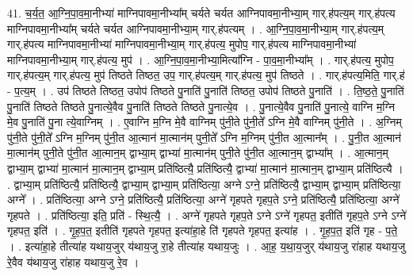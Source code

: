 \documentclass[17pt]{extarticle}
\begin{document}
41. च॒र्य॒त॒ आ॒ग्नि॒पा॒व॒मा॒नीभ्या॑ माग्निपावमा॒नीभ्या᳚म् चर्यते चर्यत आग्निपावमा॒नीभ्या॒म् गार्.ह॑पत्य॒म् गार्.ह॑पत्य माग्निपावमा॒नीभ्या᳚म् चर्यते चर्यत आग्निपावमा॒नीभ्या॒म् गार्.ह॑पत्यम् । . आ॒ग्नि॒पा॒व॒मा॒नीभ्या॒म् गार्.ह॑पत्य॒म् गार्.ह॑पत्य माग्निपावमा॒नीभ्या॑ माग्निपावमा॒नीभ्या॒म् गार्.ह॑पत्य॒ मुपोप॒ गार्.ह॑पत्य माग्निपावमा॒नीभ्या॑ माग्निपावमा॒नीभ्या॒म् गार्.ह॑पत्य॒ मुप॑ । . आ॒ग्नि॒पा॒व॒मा॒नीभ्या॒मित्या᳚ग्नि - पा॒व॒मा॒नीभ्या᳚म् । . गार्.ह॑पत्य॒ मुपोप॒ गार्.ह॑पत्य॒म् गार्.ह॑पत्य॒ मुप॑ तिष्ठते तिष्ठत॒ उप॒ गार्.ह॑पत्य॒म् गार्.ह॑पत्य॒ मुप॑ तिष्ठते । . गार्.ह॑पत्य॒मिति॒ गार्.ह॑ - प॒त्य॒म् । . उप॑ तिष्ठते तिष्ठत॒ उपोप॑ तिष्ठते पु॒नाति॑ पु॒नाति॑ तिष्ठत॒ उपोप॑ तिष्ठते पु॒नाति॑ । . ति॒ष्ठ॒ते॒ पु॒नाति॑ पु॒नाति॑ तिष्ठते तिष्ठते पु॒नात्ये॒वैव पु॒नाति॑ तिष्ठते तिष्ठते पु॒नात्ये॒व । . पु॒नात्ये॒वैव पु॒नाति॑ पु॒नात्ये॒ वाग्नि म॒ग्नि मे॒व पु॒नाति॑ पु॒ना त्ये॒वाग्निम् । . ए॒वाग्नि म॒ग्नि मे॒वै वाग्निम् पु॑नी॒ते पु॑नी॒ते᳚ ऽग्नि मे॒वै वाग्निम् पु॑नी॒ते । . अ॒ग्निम् पु॑नी॒ते पु॑नी॒ते᳚ ऽग्नि म॒ग्निम् पु॑नी॒त आ॒त्मान॑ मा॒त्मान॑म् पुनी॒ते᳚ ऽग्नि म॒ग्निम् पु॑नी॒त आ॒त्मान᳚म् । . पु॒नी॒त आ॒त्मान॑ मा॒त्मान॑म् पुनी॒ते पु॑नी॒त आ॒त्मान॒म् द्वाभ्या॒म् द्वाभ्या॑ मा॒त्मान॑म् पुनी॒ते पु॑नी॒त आ॒त्मान॒म् द्वाभ्या᳚म् । . आ॒त्मान॒म् द्वाभ्या॒म् द्वाभ्या॑ मा॒त्मान॑ मा॒त्मान॒म् द्वाभ्या॒म् प्रति॑ष्ठित्यै॒ प्रति॑ष्ठित्यै॒ द्वाभ्या॑ मा॒त्मान॑ मा॒त्मान॒म् द्वाभ्या॒म् प्रति॑ष्ठित्यै । . द्वाभ्या॒म् प्रति॑ष्ठित्यै॒ प्रति॑ष्ठित्यै॒ द्वाभ्या॒म् द्वाभ्या॒म् प्रति॑ष्ठित्या॒ अग्ने ऽग्ने॒ प्रति॑ष्ठित्यै॒ द्वाभ्या॒म् द्वाभ्या॒म् प्रति॑ष्ठित्या॒ अग्ने᳚ । . प्रति॑ष्ठित्या॒ अग्ने ऽग्ने॒ प्रति॑ष्ठित्यै॒ प्रति॑ष्ठित्या॒ अग्ने॑ गृहपते गृहप॒ते ऽग्ने॒ प्रति॑ष्ठित्यै॒ प्रति॑ष्ठित्या॒ अग्ने॑ गृहपते । . प्रति॑ष्ठित्या॒ इति॒ प्रति॑ - स्थि॒त्यै॒ । . अग्ने॑ गृहपते गृहप॒ते ऽग्ने ऽग्ने॑ गृहपत॒ इतीति॑ गृहप॒ते ऽग्ने ऽग्ने॑ गृहपत॒ इति॑ । . गृ॒ह॒प॒त॒ इतीति॑ गृहपते गृहपत॒ इत्या॑हा॒हे ति॑ गृहपते गृहपत॒ इत्या॑ह । . गृ॒ह॒प॒त॒ इति॑ गृह - प॒ते॒ । . इत्या॑हा॒हे तीत्या॑ह यथाय॒जुर् य॑थाय॒जु रा॒हे तीत्या॑ह यथाय॒जुः । . आ॒ह॒ य॒था॒य॒जुर् य॑थाय॒जु रा॑हाह यथाय॒जु रे॒वैव य॑थाय॒जु रा॑हाह यथाय॒जु रे॒व । \newline
\pagebreak
{}
\end{document}
